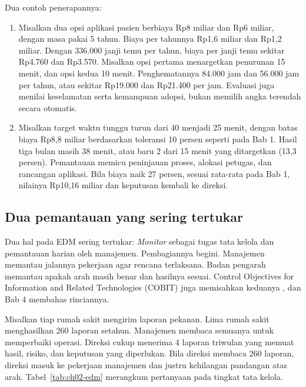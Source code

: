 Dua contoh penerapannya:
\begin{enumerate}
  \item Misalkan dua opsi aplikasi pasien berbiaya Rp8 miliar dan Rp6 miliar, dengan masa
  pakai 5 tahun. Biaya per tahunnya Rp1,6 miliar dan Rp1,2 miliar. Dengan 336.000 janji
  temu per tahun, biaya per janji temu sekitar Rp4.760 dan Rp3.570. Misalkan opsi pertama
  menargetkan penurunan 15 menit, dan opsi kedua 10 menit. Penghematannya 84.000 jam dan
  56.000 jam per tahun, atau sekitar Rp19.000 dan Rp21.400 per jam. Evaluasi juga menilai
  keselamatan serta kemampuan adopsi, bukan memilih angka terendah secara otomatis.
  \item Misalkan target waktu tunggu turun dari 40 menjadi 25 menit, dengan batas biaya
  Rp8,8 miliar berdasarkan toleransi 10 persen seperti pada Bab 1. Hasil tiga bulan masih
  38 menit, atau baru 2 dari 15 menit yang ditargetkan (13,3 persen). Pemantauan memicu
  peninjauan proses, alokasi petugas, dan rancangan aplikasi. Bila biaya naik 27 persen,
  sesuai rata-rata pada Bab 1, nilainya Rp10,16 miliar dan keputusan kembali ke direksi.
\end{enumerate}

\subsection*{Dua pemantauan yang sering tertukar}

Dua hal pada EDM sering tertukar: \textit{Monitor} sebagai tugas tata kelola dan pemantauan
harian oleh manajemen. Pembagiannya begini. Manajemen memantau jalannya pekerjaan agar
rencana terlaksana. Badan pengarah memantau apakah arah masih benar dan hasilnya sesuai.
Control Objectives for Information and Related Technologies (COBIT) juga memisahkan
keduanya \cite{cobit2019-intro}, dan Bab 4 membahas rinciannya.

Misalkan tiap rumah sakit mengirim laporan pekanan. Lima rumah sakit menghasilkan 260
laporan setahun. Manajemen membaca semuanya untuk memperbaiki operasi. Direksi cukup
menerima 4 laporan triwulan yang memuat hasil, risiko, dan keputusan yang diperlukan. Bila
direksi membaca 260 laporan, direksi masuk ke pekerjaan manajemen dan justru kehilangan
pandangan atas arah. Tabel~\ref{tab:ch02-edm} merangkum pertanyaan pada tingkat tata kelola.

